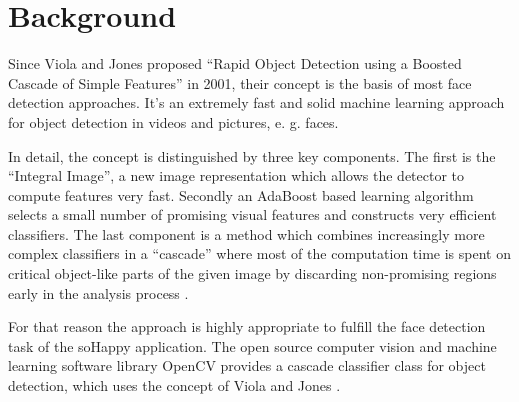 \section{Background} \label{sec:background}
Since Viola and Jones proposed ``Rapid Object Detection using a Boosted Cascade of Simple Features'' in 2001, their concept is the basis of most face detection approaches.
It's an extremely fast and solid machine learning approach for object detection in videos and pictures, e. g. faces.

In detail, the concept is distinguished by three key components.
The first is the “Integral Image”, a new image representation which allows the detector to compute features very fast.
Secondly an AdaBoost based learning algorithm selects a small number of promising visual features and constructs very efficient classifiers.
The last component is a method which combines increasingly more complex classifiers in a “cascade” where most of the computation time is spent on critical object-like parts of the given image by discarding non-promising regions early in the analysis process \cite{viola_jones}.

For that reason the approach is highly appropriate to fulfill the face detection task of the soHappy application.
The open source computer vision and machine learning software library OpenCV provides a cascade classifier class for object detection, which uses the concept of Viola and Jones \cite{opencv_cascade_classifier}.

